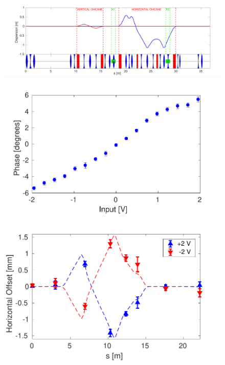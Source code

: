 \documentclass[%
 reprint,
 superscriptaddress,
 amsmath,
 amssymb,
 prstab,
]{revtex4-1}
\begin{document}
\begin{figure}
	\includegraphics[width=\textwidth]{figs/optics/pffOpticsDisp}%
	\caption{\label{f:pffOpticsDisp}
	}
\end{figure}

\begin{figure}
	\includegraphics[width=\columnwidth]{figs/optics/corrRange}%
	\caption{\label{f:corrRange}
	}
\end{figure}

\begin{figure}
	\includegraphics[width=\columnwidth]{figs/optics/orbClos}%
	\caption{\label{f:orbClos}
	}
\end{figure}
\end{document}
